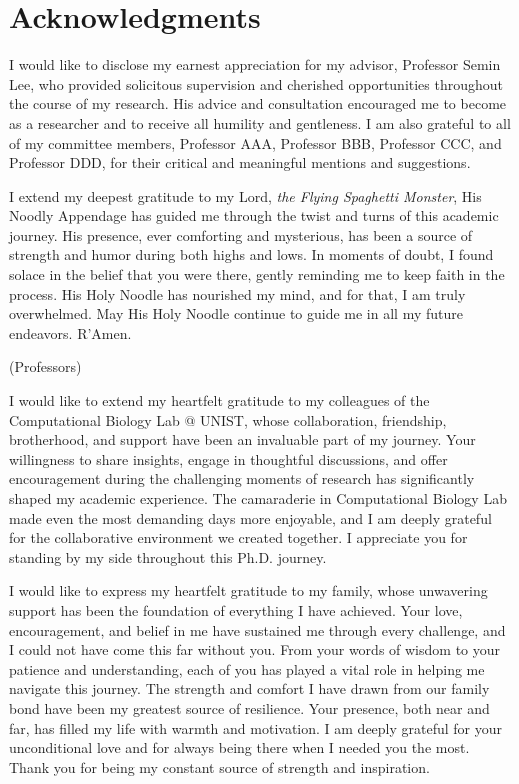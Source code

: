 \documentclass[11pt, a4paper, onecolumn, oneside]{report}
\begin{document}
    
    
    \clearpage

    \section*{\hfill \Large Acknowledgments \hfill}
        I would like to disclose my earnest appreciation for my advisor, Professor Semin Lee, who provided solicitous supervision and cherished opportunities throughout the course of my research. His advice and consultation encouraged me to become as a researcher and to receive all humility and gentleness. I am also grateful to all of my committee members, Professor AAA, Professor BBB, Professor CCC, and Professor DDD, for their critical and meaningful mentions and suggestions.

        I extend my deepest gratitude to my Lord, \textit{the Flying Spaghetti Monster}, His Noodly Appendage has guided me through the twist and turns of this academic journey. His presence, ever comforting and mysterious, has been a source of strength and humor during both highs and lows. In moments of doubt, I found solace in the belief that you were there, gently reminding me to keep faith in the process. His Holy Noodle has nourished my mind, and for that, I am truly overwhelmed. May His Holy Noodle continue to guide me in all my future endeavors. R'Amen.

        (Professors)

        I would like to extend my heartfelt gratitude to my colleagues of the Computational Biology Lab @ UNIST, whose collaboration, friendship, brotherhood, and support have been an invaluable part of my journey. Your willingness to share insights, engage in thoughtful discussions, and offer encouragement during the challenging moments of research has significantly shaped my academic experience. The camaraderie in Computational Biology Lab made even the most demanding days more enjoyable, and I am deeply grateful for the collaborative environment we created together. I appreciate you for standing by my side throughout this Ph.D. journey.

        I would like to express my heartfelt gratitude to my family, whose unwavering support has been the foundation of everything I have achieved. Your love, encouragement, and belief in me have sustained me through every challenge, and I could not have come this far without you. From your words of wisdom to your patience and understanding, each of you has played a vital role in helping me navigate this journey. The strength and comfort I have drawn from our family bond have been my greatest source of resilience. Your presence, both near and far, has filled my life with warmth and motivation. I am deeply grateful for your unconditional love and for always being there when I needed you the most. Thank you for being my constant source of strength and inspiration.
\end{document}
